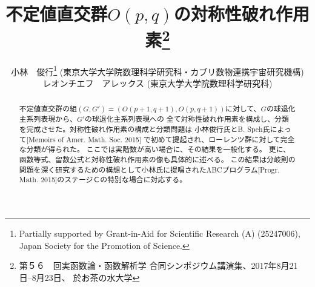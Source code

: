 \documentclass[12pt]{article} %
\theoremstyle{definition}
\theoremstyle{exampstyle} \newtheorem{examp}[theorem]{Theorem}
\begin{document}
\renewcommand{\abstractname}{概要}

\title{不定値直交群$O(p,q)$の対称性破れ作用素\thanks{第５６　回実函数論・函数解析学 合同シンポジウム講演集、2017年8月21日--8月23日、
於\;お茶の水大学}}

\author{小林　俊行\thanks{Partially supported by Grant-in-Aid for Scientific
Research (A) (25247006), Japan Society for the Promotion of Science.} (東京大学\;大学院数理科学研究科{・}カブリ数物連携宇宙研究機構)\\
  レオンチエフ　アレックス (東京大学\;大学院数理科学研究科)}




  \maketitle
\begin{abstract}
	不定値直交群の組$(G, G') =(O(p+1, q+1), O(p,q+1))$に対して、$G$の球退化主系列表現から、$G'$の球退化主系列表現への
	全て対称性破れ作用素を構成し、分類
	を完成させた。対称性破れ作用素の構成と分類問題{は}
	小林俊行氏とB. Speh氏によって[Memoirs of Amer. Math. Soc. 2015]
	で初めて提起され、ローレンツ群に対して完全な分類が得られた。
	ここでは実階数が高い場合に、その結果を一般化する。
	更に、函数等式、留数公式と対称性破れ作用素の像も具体的に述べる。
	この結果は分岐則の問題を深く研究するための構想として小林氏に提唱されたABCプログラム[Progr. Math. 2015]のステージＣの特別な場合に対応する。
\end{abstract}
\end{document}
